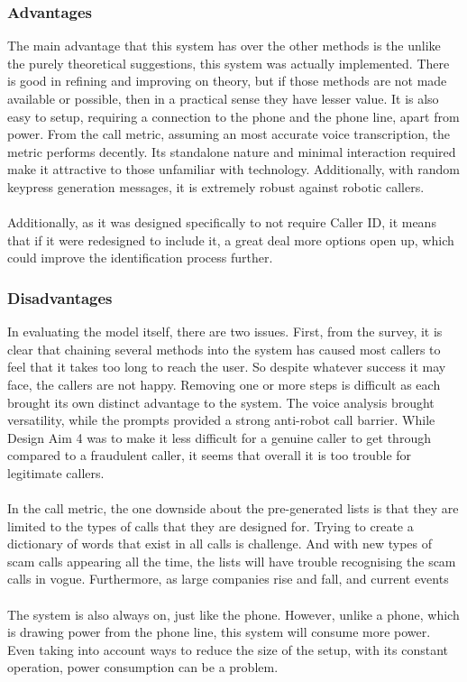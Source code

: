 \documentclass[main.tex]{subfiles}
\begin{document}
\subsubsection{Advantages}
The main advantage that this system has over the other methods is the unlike the purely theoretical suggestions, this system was actually implemented. There is good in refining and improving on theory, but if those methods are not made available or possible, then in a practical sense they have lesser value. It is also easy to setup, requiring a connection to the phone and the phone line, apart from power. From the call metric, assuming an most accurate voice transcription, the metric performs decently. Its standalone nature and minimal interaction required make it attractive to those unfamiliar with technology. Additionally, with random keypress generation messages, it is extremely robust against robotic callers.
\\\\
Additionally, as it was designed specifically to not require Caller ID, it means that if it were redesigned to include it, a great deal more options open up, which could improve the identification process further.

\subsubsection{Disadvantages}
In evaluating the model itself, there are two issues. First, from the survey, it is clear that chaining several methods into the system has caused most callers to feel that it takes too long to reach the user. So despite whatever success it may face, the callers are not happy. Removing one or more steps is difficult as each brought its own distinct advantage to the system. The voice analysis brought versatility, while the prompts provided a strong anti-robot call barrier. While Design Aim 4 was to make it less difficult for a genuine caller to get through compared to a fraudulent caller, it seems that overall it is too trouble for legitimate callers.
\\\\
In the call metric, the one downside about the pre-generated lists is that they are limited to the types of calls that they are designed for. Trying to create a dictionary of words that exist in all calls is challenge. And with new types of scam calls appearing all the time, the lists will have trouble recognising the scam calls in vogue. Furthermore, as large companies rise and fall, and current events
\\\\
The system is also always on, just like the phone. However, unlike a phone, which is drawing power from the phone line, this system will consume more power. Even taking into account ways to reduce the size of the setup, with its constant operation, power consumption can be a problem.
\end{document}
